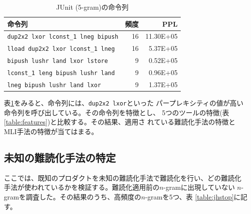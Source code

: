 \documentclass[a4j,fleqn,10pt]{jarticle}
\begin{document}
\begin{table}[t]
  \centering
  \footnotesize{
    \caption{JUnit (5-gram)の命令列}\label{table:junit}
  \begin{tabular}{l|r|r}
    命令列 & 頻度 & PPL \\ \hline
    \texttt{dup2x2 lxor lconst\_1 lneg bipush}   & 16 & 11.30E+05 \\
    \texttt{lload dup2x2 lxor lconst\_1 lneg}    & 16 &  5.37E+05 \\
    \texttt{bipush lushr land lxor lstore}       &  9 &  0.52E+05 \\
    \texttt{lconst\_1 leng bipush lushr land}    &  9 &  0.96E+05 \\
    \texttt{lneg bipush lushr land lxor}         &  9 &  1.37E+05 \\
  \end{tabular}}
\end{table}

表\ref{table:junit}をみると、命令列には、\texttt{dup2x2 lxor}といった
パープレキシティの値が高い命令列を呼び出している。その命令列を特徴とし、
5つのツールの特徴(表\ref{table:features})と比較する。その結果、適用さ
れている難読化手法の特徴とMLI手法の特徴が当てはまる。

\subsection{未知の難読化手法の特定}

ここでは、既知のプロダクトを未知の難読化手法で難読化を行い、どの難読化
手法が使われているかを検証する。難読化適用前の$n$-gramに出現していない
$n$-gramを調査した。その結果のうち、高頻度の$n$-gramを5つ、表
\ref{table:jhstop}に記す。
\end{document}
